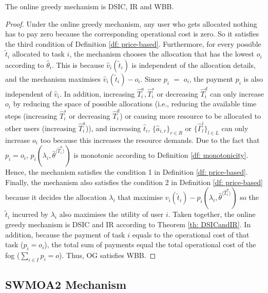 \documentclass[11pt]{phdthesis}
\begin{document}
\begin{theorem} \label{th: online greedy}
    The online greedy mechanism is DSIC, IR and WBB.
\end{theorem}

\begin{proof}
    Under the online greedy mechanism, any user who gets allocated nothing has to pay zero because the corresponding operational cost is zero. So it satisfies the third condition of Definition \ref{df: price-based}. Furthermore, for every possible $\tilde{t}_i$ allocated to task $i$, the mechanism chooses the allocation that has the lowest $ o_i $ according to $ \hat{\theta}_i $. This is because $\hat{v}_i(\tilde{t}_i)$ is independent of the allocation details, and the mechanism maximises $\hat{v}_i(\tilde{t}_i) -  o_i$. Since $ p_i$ $ = $ $ o_i $, the payment $ p_i$ is also independent of $ \hat{v}_i $. In addition, increasing $\hat{T}_i^a, \hat{T}_i^s$ or decreasing  $ \hat{T}_i^d$ can only increase $o_i$ by reducing the space of possible allocations (i.e., reducing the available time steps (increasing $\hat{T}_i^s$ or decreasing $\hat{T}_i^d$) or causing more resource to be allocated to other users (increasing $\hat{T}_i^a$)), and increasing $ \hat{t}_i $, $ \{ \hat{a}_{i,r} \}_{r \in R} $ or $ \{ \hat{\Gamma}_l^i \}_{l \in L} $ can only increase $ o_i $ too because this increases the resource demands. Due to the fact that $ p_i= o_i $, $ p_i(\lambda_i, \hat{\theta}^{\langle \hat{T}_i^a \rangle}) $ is monotonic according to Definition \ref{df: monotonicity}. Hence, the mechanism satisfies the condition 1 in Definition \ref{df: price-based}. Finally, the mechanism also satisfies the condition 2 in Definition \ref{df: price-based} because it decides the allocation $ \lambda_i $ that maximise $\hat{v}_i(\tilde{t}_i) - p_i(\lambda_i, \hat{\theta}^{\langle \hat{T}_i^a \rangle})$ so the $ \tilde{t}_i $ incurred by $ \lambda_i $ also maximises the utility of user $ i $. Taken together, the online greedy mechanism is DSIC and IR according to Theorem \ref{th: DSICandIR}. In addition, because the payment of task $ i $ equals to the operational cost of that task ($ p_i = o_i $), the total sum of payments equal the total operational cost of the fog ($ \sum_{i \in I}{p_i} = o $). Thus, OG satisfies WBB.
\end{proof}

\subsection{SWMOA2 Mechanism}
\end{document}
